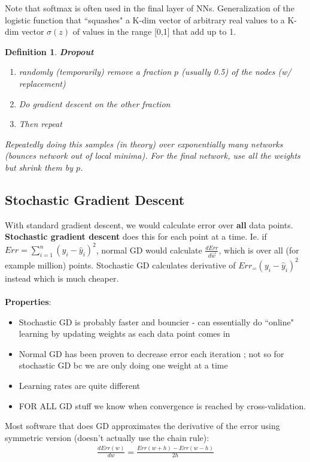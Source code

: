 \documentclass[a4paper]{article}\usepackage[]{graphicx}\usepackage[]{color}
\newtheorem{defn}{Definition}[section]
\begin{document}
Note that softmax is often used in the final layer of NNs. Generalization of the logistic function that ``squashes" a K-dim vector of arbitrary real values to a K-dim vector $\sigma(z)$ of values in the range [0,1] that add up to 1. 

\begin{defn}
\textbf{Dropout} 
\begin{enumerate}
\item randomly (temporarily) remove a fraction $p$ (usually 0.5) of the nodes (w/ replacement)
\item Do gradient descent on the other fraction
\item Then repeat
\end{enumerate}
Repeatedly doing this samples (in theory) over exponentially many networks (bounces network out of local minima). For the final network, use all the weights but shrink them by $p$. 
\end{defn}

\subsection{Stochastic Gradient Descent}
With standard gradient descent, we would calculate error over \textbf{all} data points. \textbf{Stochastic gradient descent} does this for each point at a time. Ie. if $Err = \sum_{i=1}^n (y_i-\hat{y}_i)^2$, normal GD would calculate $\frac{dErr}{d\overrightarrow{w}}$, which is over all (for example million) points. Stochastic GD  calculates derivative of $Err_= (y_i-\hat{y}_i)^2$ instead which is much cheaper. \\
\\
\textbf{Properties}:
\begin{itemize}
\item Stochastic GD is probably faster and bouncier - can essentially do ``online" learning by updating weights as each data point comes in 
\item Normal GD has been proven to decrease error each iteration ; not so for stochastic GD bc we are only doing one weight at a time
\item Learning rates are quite different
\item FOR ALL GD stuff we know when convergence is reached by cross-validation.
\end{itemize}

Most software that does GD approximates the derivative of the error using symmetric version (doesn't actually use the chain rule):
\begin{align*}
\frac{dErr(w)}{dw} = \frac{Err(w+h)-Err(w-h)}{2h}
\end{align*}
\end{document}
